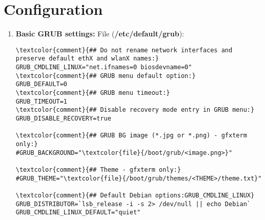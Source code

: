 \documentclass[10pt, a4paper, onecolumn, openany]{book} %
\begin{document}
\section{Configuration}
\begin{enumerate}
    \item \textbf{Basic GRUB settings:}
\newline File (\textbf{\textcolor{file}{/etc/default/grub}}):
\begin{Verbatim}[commandchars=\\\{\}]
\textcolor{comment}{## Do not rename network interfaces and preserve default ethX and wlanX names:}
GRUB_CMDLINE_LINUX="net.ifnames=0 biosdevname=0"
\textcolor{comment}{## GRUB menu default option:}
GRUB_DEFAULT=0
\textcolor{comment}{## GRUB menu timeout:}
GRUB_TIMEOUT=1
\textcolor{comment}{## Disable recovery mode entry in GRUB menu:}
GRUB_DISABLE_RECOVERY=true

\textcolor{comment}{## GRUB BG image (*.jpg or *.png) - gfxterm only:}
#GRUB_BACKGROUND="\textcolor{file}{/boot/grub/<image.png>}"

\textcolor{comment}{## Theme - gfxterm only:}
#GRUB_THEME="\textcolor{file}{/boot/grub/themes/<THEME>/theme.txt}"

\textcolor{comment}{## Default Debian options:GRUB_CMDLINE_LINUX}
GRUB_DISTRIBUTOR=`lsb_release -i -s 2> /dev/null || echo Debian`
GRUB_CMDLINE_LINUX_DEFAULT="quiet"
\end{Verbatim}
\end{enumerate}
\end{document}

